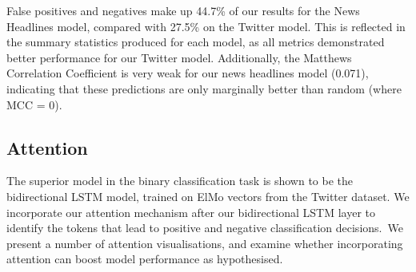 \documentclass[12pt,a4paper]{article}
\begin{document}
\noindent False positives and negatives make up 44.7\% of our results for the News Headlines model, compared with 27.5\% on the Twitter model. This is reflected in the summary statistics produced for each model, as all metrics demonstrated better performance for our Twitter model. Additionally, the Matthews Correlation Coefficient is very weak for our news headlines model (0.071), indicating that these predictions are only marginally better than random (where MCC = 0).

\subsection{Attention}\vspace{-5pt}
\noindent The superior model in the binary classification task is shown to be the bidirectional LSTM model, trained on ElMo vectors from the Twitter dataset. We incorporate our attention mechanism after our bidirectional LSTM layer to identify the tokens that lead to positive and negative classification decisions.\ We present a number of attention visualisations, and examine whether incorporating attention can boost model performance as hypothesised.\\\vspace{-5pt}
\end{document}
